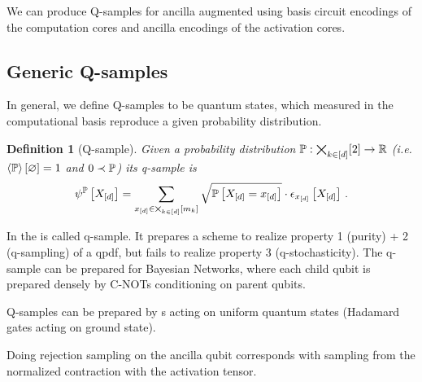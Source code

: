 \documentclass[aps,onecolumn,nofootinbib,pra]{article}
\newtheorem{lemma}{Lemma}
\newtheorem{definition}{Definition}
\begin{document}
    We can produce Q-samples for ancilla augmented \ComputationActivationNetworks{}  using basis circuit encodings of the computation cores and ancilla encodings of the activation cores.

    \subsection{Generic Q-samples}

    In general, we define Q-samples to be quantum states, which measured in the computational basis reproduce a given probability distribution.

    \begin{definition}[Q-sample]
        Given a probability distribution $\mathbb{P}:\bigtimes_{k\in[d]}[2]\rightarrow\mathbb{R}$ (i.e. $\left\langle \mathbb{P}\right\rangle \left[ \varnothing \right]=1$ and $0 \prec \mathbb{P}$) its q-sample is
        \begin{align*}
            \psi^{\mathbb{P}}\left[X_{[d]}\right]
            = \sum_{x_{[d]}\in\bigtimes_{k\in[d]}[m_{k}]} \sqrt{\mathbb{P}\left[X_{[d]}=x_{[d]}\right]} \cdot \epsilon_{x_{[d]}}\left[X_{[d]}\right] \, .
        \end{align*}
    \end{definition}

    In \cite{low_quantum_2014} the \activationCircuit{} is called q-sample.
    It prepares a scheme to realize property 1 (purity) + 2 (q-sampling) of a qpdf, but fails to realize property 3 (q-stochasticity).
    The q-sample can be prepared for Bayesian Networks, where each child qubit is prepared densely by C-NOTs conditioning on parent qubits.

    Q-samples can be prepared by \activationCircuit{}s acting on uniform quantum states (Hadamard gates acting on ground state).


    Doing rejection sampling on the ancilla qubit corresponds with sampling from the normalized contraction with the activation tensor.
\end{document}
